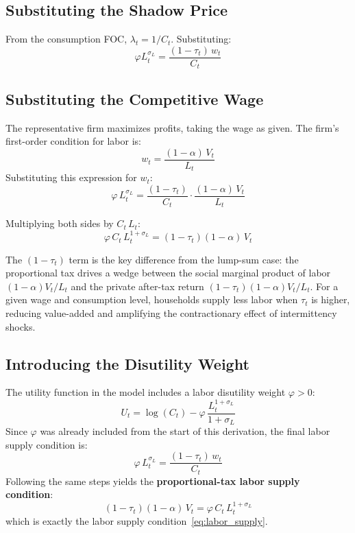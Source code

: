 \documentclass[12pt, a4paper]{article}
\begin{document}
	\subsection*{Substituting the Shadow Price}
	
	From the consumption FOC, $\lambda_t = 1/C_t$. Substituting:
	\begin{equation*}
		\varphi L_t^{\sigma_L} = \frac{(1-\tau_t)\, w_t}{C_t}
	\end{equation*}
	
	\subsection*{Substituting the Competitive Wage}
	
	The representative firm maximizes profits, taking the wage as given. The firm's first-order condition for labor is:
	\begin{equation*}
		w_t = \frac{(1-\alpha)\,V_t}{L_t}
	\end{equation*}
	Substituting this expression for $w_t$:
	\begin{equation*}
		\varphi\, L_t^{\sigma_L} = \frac{(1-\tau_t)}{C_t} \cdot \frac{(1-\alpha)\,V_t}{L_t}
	\end{equation*}
	
	Multiplying both sides by $C_t \, L_t$:
	\begin{equation*}
		\varphi \, C_t \, L_t^{1+\sigma_L} = (1-\tau_t)(1-\alpha)\,V_t
	\end{equation*}
	
	\noindent The $(1-\tau_t)$ term is the key difference from the lump-sum case: the proportional tax drives a wedge between the social marginal product of labor $(1-\alpha)V_t/L_t$ and the private after-tax return $(1-\tau_t)(1-\alpha)V_t/L_t$. For a given wage and consumption level, households supply less labor when $\tau_t$ is higher, reducing value-added and amplifying the contractionary effect of intermittency shocks.
	
	\subsection*{Introducing the Disutility Weight}
	
	The utility function in the model includes a labor disutility weight $\varphi > 0$:
	\begin{equation*}
		U_t = \log(C_t) - \varphi\,\frac{L_t^{1+\sigma_L}}{1+\sigma_L}
	\end{equation*}
	Since $\varphi$ was already included from the start of this derivation, the final labor supply condition is:
	\begin{equation*}
		\varphi\, L_t^{\sigma_L} = \frac{(1-\tau_t)\,w_t}{C_t}
	\end{equation*}
	Following the same steps yields the \textbf{proportional-tax labor supply condition}:
	\begin{equation*}
		(1-\tau_t)(1-\alpha)\,V_t = \varphi\,C_t\,L_t^{1+\sigma_L}
	\end{equation*}
	which is exactly the labor supply condition~\eqref{eq:labor_supply}.
	
\end{document}
